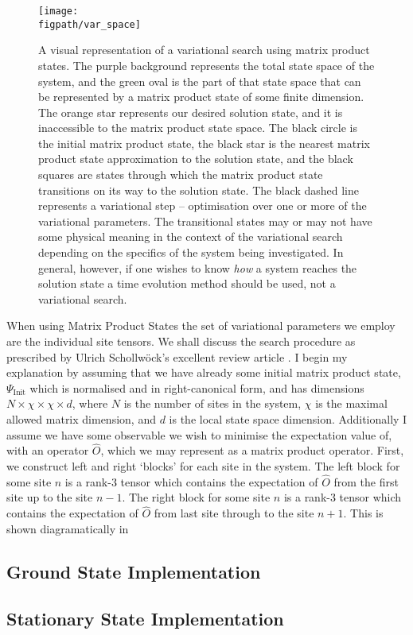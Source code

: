 \begin{figure}[h!]
\centering
\texttt{[image: \\figpath/var\_space]}
\caption{A visual representation of a variational search using matrix product states. The purple background represents the total state space of the system, and the green oval is the part of that state space that can be represented by a matrix product state of some finite dimension. The orange star represents our desired solution state, and it is inaccessible to the matrix product state space. The black circle is the initial matrix product state, the black star is the nearest matrix product state approximation to the solution state, and the black squares are states through which the matrix product state transitions on its way to the solution state. The black dashed line represents a variational step -- optimisation over one or more of the variational parameters. The transitional states may or may not have some physical meaning in the context of the variational search depending on the specifics of the system being investigated. In general, however, if one wishes to know \emph{how} a system reaches the solution state a time evolution method should be used, not a variational search.}
\label{fig:vs1-1}
\end{figure}

When using Matrix Product States the set of variational parameters we employ are the individual site tensors. We shall discuss the search procedure as prescribed by Ulrich Schollw\"{o}ck's excellent review article \cite{Schollwoeck11}. I begin my explanation by assuming that we have already some initial matrix product state, \(\Psi_{\mathrm{Init}}\) which is normalised and in right-canonical form, and has dimensions \(N \times \chi \times \chi \times d\), where \(N\) is the number of sites in the system, \(\chi\) is the maximal allowed matrix dimension, and \(d\) is the local state space dimension. Additionally I assume we have some observable we wish to minimise the expectation value of, with an operator \(\hat{O}\), which we may represent as a matrix product operator. First, we construct left and right `blocks' for each site in the system. The left block for some site \(n\) is a rank-3 tensor which contains the expectation of \(\hat{O}\) from the first site up to the site \(n-1\). The right block for some site \(n\) is a rank-3 tensor which contains the expectation of \(\hat{O}\) from last site through to the site \(n+1\). This is shown diagramatically in


 
 \subsection{Ground State Implementation}
 
 \subsection{Stationary State Implementation}